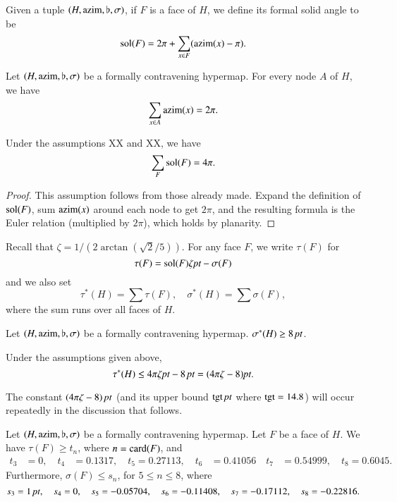 Given a tuple $(H,{\operatorname{azim}},\flat,\sigma)$, if $F$ is a face of $H$, we
define its formal solid angle to be
    $$\operatorname{sol}(F) = 2\pi + \sum_{x\in F}({\operatorname{azim}}(x) - \pi).$$

\begin{lemma}  Let $(H,{\operatorname{azim}},\flat,\sigma)$ be a formally contravening
hypermap.  For every node $A$ of $H$, we have
    $$\sum_{x\in A} {\operatorname{azim}} (x) = 2\pi.$$
\end{lemma}

\begin{lemma} Under the assumptions XX and XX, we have
    $$\sum_{F} \operatorname{sol}(F) = 4\pi.$$
\end{lemma}

\begin{proof} This assumption follows from those already made.
Expand the definition of $\operatorname{sol}(F)$, sum ${\operatorname{azim}}(x)$ around each node
to get $2\pi$, and the resulting formula is the Euler relation
(multiplied by $2\pi$), which holds by planarity.
\end{proof}

Recall that $\zeta = 1/(2\arctan(\sqrt{2}/5))$. For any face $F$, we
write $\tau(F)$ for
%
    \begin{equation}
    \tau(F) = \operatorname{sol}(F)\zeta\hbox{\it pt} - \sigma(F)
    \label{eqn:tauR-def}
    \end{equation}
and we also set
    \begin{equation}
    \tau^*(H) = \sum\tau(F),\quad \sigma^*(H) =\sum\sigma(F),
    \label{eqn:tau-def}
    \end{equation}
where the sum runs over all faces of $H$.

\begin{lemma}  Let $(H,{\operatorname{azim}},\flat,\sigma)$ be a formally contravening
hypermap.
    $\sigma^*(H) \ge 8\,\hbox{\it pt}$.
\end{lemma}

\begin{lemma}
     Under the assumptions given above,
    \begin{equation}
    \tau^*(H) \le 4\pi\zeta\hbox{\it pt} -8\,\hbox{\it pt} = (4\pi\zeta-8)\hbox{\it pt}.
    \label{eqn:tau-sig}
    \end{equation}
\end{lemma} The constant $(4\pi\zeta-8)\,\hbox{\it pt}$  (and its upper bound ${\operatorname{tgt}}\,\hbox{\it pt}$
where ${\operatorname{tgt}}=14.8$) will occur repeatedly in the discussion that
follows.

\begin{lemma} \label{lemma:sn-tn}  Let $(H,{\operatorname{azim}},\flat,\sigma)$ be a formally contravening
hypermap. Let $F$ be a face of $H$.  We have $\tau(F)\ge t_n$, where
$n={\operatorname{card}}(F)$, and
    $$
    \begin{array}{lllll}
    t_3&=0,\quad t_4&=0.1317,\quad t_5=0.27113,\quad
    t_6&=0.41056\quad t_7&=0.54999,\quad t_8=0.6045.
    \end{array}
    $$
Furthermore, $\sigma(F)\le s_n$, for $5\le n\le 8$, where
    $$
    s_3=1\,\hbox{\it pt},\quad s_4=0,\quad
    s_5=-0.05704,\quad s_6=-0.11408,\quad
    s_7=-0.17112,\quad s_8=-0.22816.
    $$
\end{lemma}


